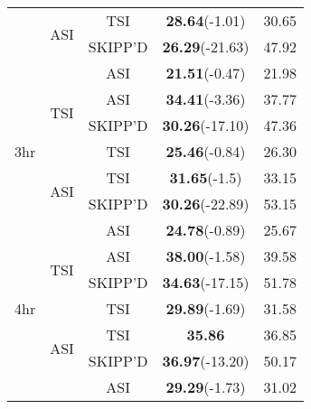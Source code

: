 \begin{table}[h!]
\begin{tabular}{c c c c c}
                          \cline{2-5}
                          & \multirow{2}{*}{ASI} & TSI & \textbf{28.64}\hspace{1mm}\small{\textcolor{mydarkgreen}{(-1.01)}} & 30.65 \\
                          & & SKIPP'D & \textbf{26.29}\hspace{1mm}\small{\textcolor{mydarkgreen}{(-21.63)}} & 47.92 \\
                          & & ASI & \textbf{21.51}\hspace{1mm}\small{\textcolor{mydarkgreen}{(-0.47)}} & 21.98 \\
    \hline
    \multirow{5}{*}{3hr} & \multirow{2}{*}{TSI} & ASI & \textbf{34.41}\hspace{1mm}\small{\textcolor{mydarkgreen}{(-3.36)}} & 37.77 \\
                          & & SKIPP'D & \textbf{30.26}\hspace{1mm}\small{\textcolor{mydarkgreen}{(-17.10)}} & 47.36 \\
                          & & TSI & \textbf{25.46}\hspace{1mm}\small{\textcolor{mydarkgreen}{(-0.84)}} & 26.30 \\
                          \cline{2-5}
                          & \multirow{2}{*}{ASI} & TSI & \textbf{31.65}\hspace{1mm}\small{\textcolor{mydarkgreen}{(-1.5)}} & 33.15 \\
                          & & SKIPP'D & \textbf{30.26}\hspace{1mm}\small{\textcolor{mydarkgreen}{(-22.89)}} & 53.15 \\
                          & & ASI & \textbf{24.78}\hspace{1mm}\small{\textcolor{mydarkgreen}{(-0.89)}} & 25.67 \\
    \hline
    \multirow{5}{*}{4hr} & \multirow{2}{*}{TSI} & ASI & \textbf{38.00}\hspace{1mm}\small{\textcolor{mydarkgreen}{(-1.58)}} & 39.58 \\
                          & & SKIPP'D & \textbf{34.63}\hspace{1mm}\small{\textcolor{mydarkgreen}{(-17.15)}} & 51.78 \\
                          & & TSI & \textbf{29.89}\hspace{1mm}\small{\textcolor{mydarkgreen}{(-1.69)}} & 31.58 \\
                          \cline{2-5}
                          & \multirow{2}{*}{ASI} & TSI & \textbf{35.86}\small\hspace{1mm}{\textcolor{mydarkgreen}{(-0.99)}} & 36.85 \\
                          & & SKIPP'D & \textbf{36.97}\hspace{1mm}\small{\textcolor{mydarkgreen}{(-13.20)}} & 50.17 \\
                          & & ASI & \textbf{29.29}\hspace{1mm}\small{\textcolor{mydarkgreen}{(-1.73)}} & 31.02 \\
    \hline
  \end{tabular}
\end{table}
